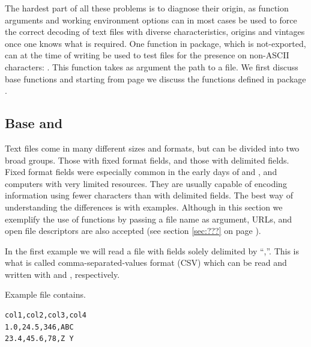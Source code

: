 \documentclass[krantz2]{krantz}\usepackage{knitr}%
\begin{document}
\begin{explainbox}
The hardest part of all these problems is to diagnose their origin, as function arguments and working environment options can in most cases be used to force the correct decoding of text files with diverse characteristics, origins and vintages once one knows what is required. One function in \Rlang {} package, which is not-exported, can at the time of writing be used to test files for the presence on non-ASCII characters: . This function takes as argument the path to a file. We first discuss base \Rlang functions and starting from page \pageref{sec:files:readr} we discuss the functions defined in package .
\end{explainbox}

\subsection[Base R and `utils']{Base \Rlang and }
Text files come in many different sizes and formats, but can be divided into two broad groups. Those with fixed format fields, and those with delimited fields. Fixed format fields were especially common in the early days of  and , and computers with very limited resources. They are usually capable of encoding information using fewer characters than with delimited fields. The best way of understanding the differences is with examples. Although in this section we exemplify the use of functions by passing a file name as argument, URLs, and open file descriptors are also accepted (see section \ref{sec:???} on page \pageref{sec:???}).

In the first example we will read a file with fields solely delimited by ``,''. This is what is called comma-separated-values format (CSV) which can be read and written with  and , respectively.

Example file  contains.

\begin{knitrout}\footnotesize
{}\color{fgcolor}\begin{kframe}
\begin{verbatim}
col1,col2,col3,col4
1.0,24.5,346,ABC
23.4,45.6,78,Z Y
\end{verbatim}
\end{kframe}
\end{knitrout}
\end{document}
